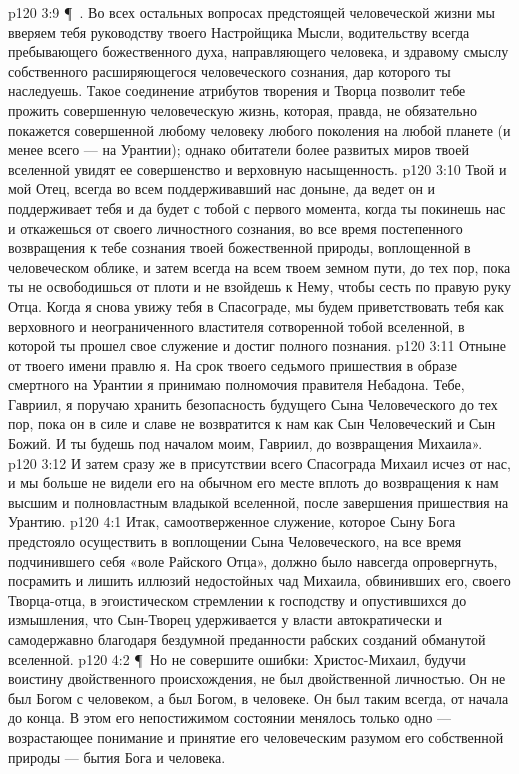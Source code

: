 \vs p120 3:9 \P\ . Во всех остальных вопросах предстоящей человеческой жизни мы вверяем тебя руководству твоего Настройщика Мысли, водительству всегда пребывающего божественного духа, направляющего человека, и здравому смыслу собственного расширяющегося человеческого сознания, дар которого ты наследуешь. Такое соединение атрибутов творения и Творца позволит тебе прожить совершенную человеческую жизнь, которая, правда, не обязательно покажется совершенной любому человеку любого поколения на любой планете (и менее всего --- на Урантии); однако обитатели более развитых миров твоей вселенной увидят ее совершенство и верховную насыщенность.
\vs p120 3:10 Твой и мой Отец, всегда во всем поддерживавший нас доныне, да ведет он и поддерживает тебя и да будет с тобой с первого момента, когда ты покинешь нас и откажешься от своего личностного сознания, во все время постепенного возвращения к тебе сознания твоей божественной природы, воплощенной в человеческом облике, и затем всегда на всем твоем земном пути, до тех пор, пока ты не освободишься от плоти и не взойдешь к Нему, чтобы сесть по правую руку Отца. Когда я снова увижу тебя в Спасограде, мы будем приветствовать тебя как верховного и неограниченного властителя сотворенной тобой вселенной, в которой ты прошел свое служение и достиг полного познания.
\vs p120 3:11 Отныне от твоего имени правлю я. На срок твоего седьмого пришествия в образе смертного на Урантии я принимаю полномочия правителя Небадона. Тебе, Гавриил, я поручаю хранить безопасность будущего Сына Человеческого до тех пор, пока он в силе и славе не возвратится к нам как Сын Человеческий и Сын Божий. И ты будешь под началом моим, Гавриил, до возвращения Михаила».
\separatorline
\vs p120 3:12 И затем сразу же в присутствии всего Спасограда Михаил исчез от нас, и мы больше не видели его на обычном его месте вплоть до возвращения к нам высшим и полновластным владыкой вселенной, после завершения пришествия на Урантию.
\vs p120 4:1 Итак, самоотверженное служение, которое Сыну Бога предстояло осуществить в воплощении Сына Человеческого, на все время подчинившего себя «воле Райского Отца», должно было навсегда опровергнуть, посрамить и лишить иллюзий недостойных чад Михаила, обвинивших его, своего Творца\hyp{}отца, в эгоистическом стремлении к господству и опустившихся до измышления, что Сын\hyp{}Творец удерживается у власти автократически и самодержавно благодаря бездумной преданности рабских созданий обманутой вселенной.
\vs p120 4:2 \P\ Но не совершите ошибки: Христос\hyp{}Михаил, будучи воистину двойственного происхождения, не был двойственной личностью. Он не был Богом  с человеком, а был Богом,  в человеке. Он был таким всегда, от начала до конца. В этом его непостижимом состоянии менялось только одно --- возрастающее понимание и принятие его человеческим разумом его собственной природы --- бытия Бога и человека.
